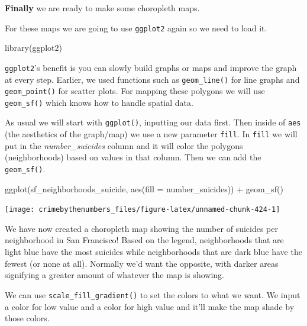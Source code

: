 \documentclass[
]{krantz}
\makeatletter
\newenvironment{Shaded}{\begin{snugshade}}{\end{snugshade}}
\newcommand{\AttributeTok}[1]{\textcolor[rgb]{0.61,0.61,0.61}{#1}}
\newcommand{\FunctionTok}[1]{\textcolor[rgb]{0,0,0}{#1}}
\newcommand{\NormalTok}[1]{#1}
\newcommand{\SpecialCharTok}[1]{\textcolor[rgb]{0,0,0}{#1}}
\newenvironment{kframe}{%
\medskip{}
\setlength{\fboxsep}{.8em}
 \def\at@end@of@kframe{}%
 \ifinner\ifhmode%
  \def\at@end@of@kframe{\end{minipage}}%
  \begin{minipage}{\columnwidth}%
 \fi\fi%
 \def\FrameCommand##1{\hskip\@totalleftmargin \hskip-\fboxsep
 \colorbox{shadecolor}{##1}\hskip-\fboxsep
     \hskip-\linewidth \hskip-\@totalleftmargin \hskip\columnwidth}%
 \MakeFramed {\advance\hsize-\width
   \@totalleftmargin\z@ \linewidth\hsize
   \@setminipage}}%
 {\par\unskip\endMakeFramed%
 \at@end@of@kframe}
\renewenvironment{Shaded}{\begin{kframe}}{\end{kframe}}
\makeatother
\begin{document}
\textbf{Finally} we are ready to make some choropleth maps.

For these maps we are going to use \texttt{ggplot2} again so we need to load it.

\begin{Shaded}
\begin{Highlighting}[]
\FunctionTok{library}\NormalTok{(ggplot2)}
\end{Highlighting}
\end{Shaded}

\texttt{ggplot2}'s benefit is you can slowly build graphs or maps and improve the graph at every step. Earlier, we used functions such as \texttt{geom\_line()} for line graphs and \texttt{geom\_point()} for scatter plots. For mapping these polygons we will use \texttt{geom\_sf()} which knows how to handle spatial data.

As usual we will start with \texttt{ggplot()}, inputting our data first. Then inside of \texttt{aes} (the aesthetics of the graph/map) we use a new parameter \texttt{fill}. In \texttt{fill} we will put in the \emph{number\_suicides} column and it will color the polygons (neighborhoods) based on values in that column. Then we can add the \texttt{geom\_sf()}.

\begin{Shaded}
\begin{Highlighting}[]
\FunctionTok{ggplot}\NormalTok{(sf\_neighborhoods\_suicide, }\FunctionTok{aes}\NormalTok{(}\AttributeTok{fill =}\NormalTok{ number\_suicides)) }\SpecialCharTok{+}
  \FunctionTok{geom\_sf}\NormalTok{() }
\end{Highlighting}
\end{Shaded}

\begin{center}\texttt{[image: crimebythenumbers\_files/figure-latex/unnamed-chunk-424-1]} \end{center}

We have now created a choropleth map showing the number of suicides per neighborhood in San Francisco! Based on the legend, neighborhoods that are light blue have the most suicides while neighborhoods that are dark blue have the fewest (or none at all). Normally we'd want the opposite, with darker areas signifying a greater amount of whatever the map is showing.

We can use \texttt{scale\_fill\_gradient()} to set the colors to what we want. We input a color for low value and a color for high value and it'll make the map shade by those colors.
\end{document}

